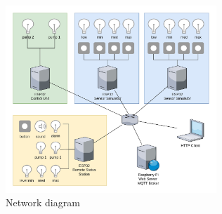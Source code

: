 \documentclass[11pt]{article}
\begin{document}
\begin{figure}[H]
  \centering
  \includegraphics[width=300px]{../diagrams/network-diagram-WPS.jpg}
  \caption{Network diagram}
  \label{fig:Network1 Diagram}
\end{figure}
\end{document}
